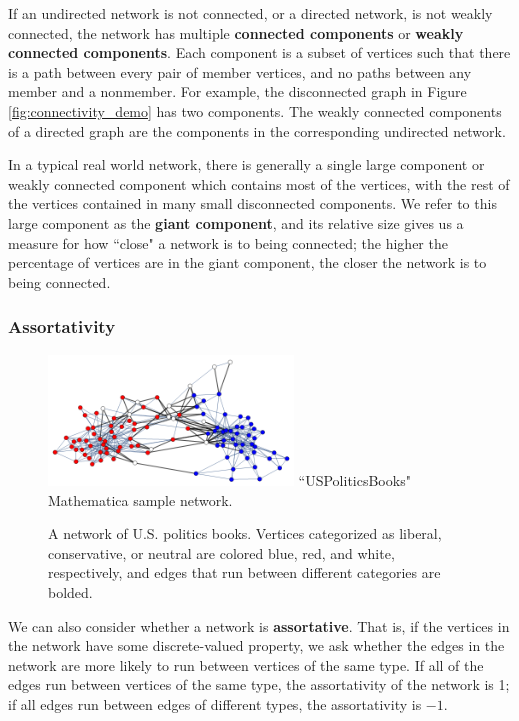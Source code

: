 \documentclass[12pt]{thesis}
\theoremstyle{plain}
\theoremstyle{definition}
\theoremstyle{remark}
\begin{document}
If an undirected network is not connected, or a directed network, is not weakly connected, the network has multiple \textbf{connected components} or \textbf{weakly connected components}. Each component is a subset of vertices such that there is a path between every pair of member vertices, and no paths between any member and a nonmember. For example, the disconnected graph in Figure \ref{fig:connectivity_demo} has two components. The weakly connected components of a directed graph are the components in the corresponding undirected network.

In a typical real world network, there is generally a single large component or weakly connected component which contains most of the vertices, with the rest of the vertices contained in many small disconnected components. We refer to this large component as the \textbf{giant component}, and its relative size gives us a measure for how ``close" a network is to being connected; the higher the percentage of vertices are in the giant component, the closer the network is to being connected.

\subsubsection{Assortativity}

\begin{figure}
\centering
\vspace{-20pt}
\includegraphics[width=0.58\textwidth]{assortativity_demo.png}
\scriptsize
``USPoliticsBooks" Mathematica sample network.
\caption{A network of U.S. politics books. Vertices categorized as liberal, conservative, or neutral are colored blue, red, and white, respectively, and edges that run between different categories are bolded.}
\label{fig:assortativity_demo}
\end{figure}

We can also consider whether a network is \textbf{assortative}. That is, if the vertices in the network have some discrete-valued property, we ask whether the edges in the network are more likely to run between vertices of the same type. If all of the edges run between vertices of the same type, the assortativity of the network is 1; if all edges run between edges of different types, the assortativity is $-1$.
\end{document}
